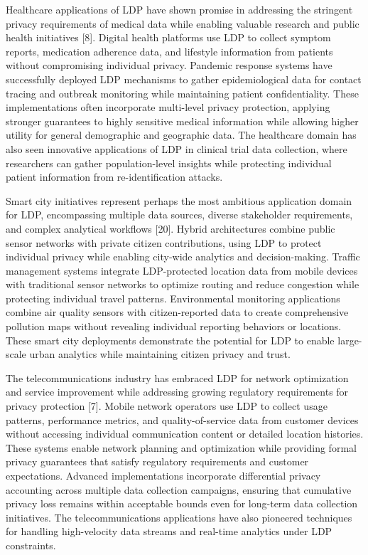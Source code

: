 \documentclass[conference]{IEEEtran}
\begin{document}
Healthcare applications of LDP have shown promise in addressing the stringent privacy requirements of medical data while enabling valuable research and public health initiatives [8]. Digital health platforms use LDP to collect symptom reports, medication adherence data, and lifestyle information from patients without compromising individual privacy. Pandemic response systems have successfully deployed LDP mechanisms to gather epidemiological data for contact tracing and outbreak monitoring while maintaining patient confidentiality. These implementations often incorporate multi-level privacy protection, applying stronger guarantees to highly sensitive medical information while allowing higher utility for general demographic and geographic data. The healthcare domain has also seen innovative applications of LDP in clinical trial data collection, where researchers can gather population-level insights while protecting individual patient information from re-identification attacks.

Smart city initiatives represent perhaps the most ambitious application domain for LDP, encompassing multiple data sources, diverse stakeholder requirements, and complex analytical workflows [20]. Hybrid architectures combine public sensor networks with private citizen contributions, using LDP to protect individual privacy while enabling city-wide analytics and decision-making. Traffic management systems integrate LDP-protected location data from mobile devices with traditional sensor networks to optimize routing and reduce congestion while protecting individual travel patterns. Environmental monitoring applications combine air quality sensors with citizen-reported data to create comprehensive pollution maps without revealing individual reporting behaviors or locations. These smart city deployments demonstrate the potential for LDP to enable large-scale urban analytics while maintaining citizen privacy and trust.

The telecommunications industry has embraced LDP for network optimization and service improvement while addressing growing regulatory requirements for privacy protection [7]. Mobile network operators use LDP to collect usage patterns, performance metrics, and quality-of-service data from customer devices without accessing individual communication content or detailed location histories. These systems enable network planning and optimization while providing formal privacy guarantees that satisfy regulatory requirements and customer expectations. Advanced implementations incorporate differential privacy accounting across multiple data collection campaigns, ensuring that cumulative privacy loss remains within acceptable bounds even for long-term data collection initiatives. The telecommunications applications have also pioneered techniques for handling high-velocity data streams and real-time analytics under LDP constraints.
\end{document}
